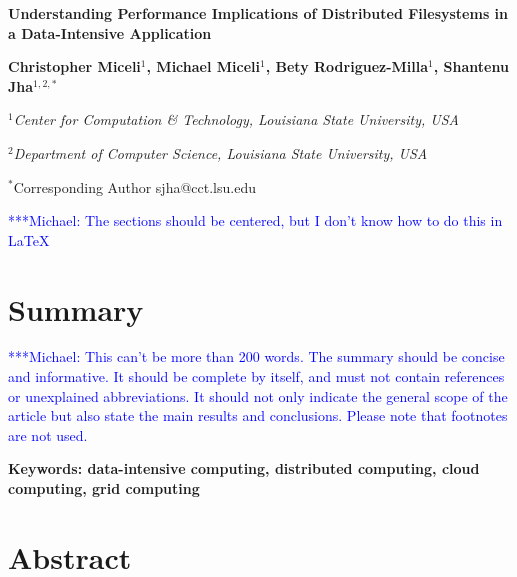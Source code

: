 \documentclass[a4paper,11pt]{article}
\newcommand{\micnote}[1]{ {\textcolor{blue} { ***Michael: #1 }}}
\newcommand{\micnote}[1]{}
\begin{document}
\begin{center}

\textbf{\large Understanding Performance Implications of Distributed
Filesystems in a Data-Intensive Application}

\vspace{0.05in}

\textbf{Christopher Miceli$^{1}$, Michael Miceli$^{1}$, Bety
Rodriguez-Milla$^{1}$, Shantenu Jha$^{1,2,*}$}

\small{\emph{$^{1}$Center for Computation \& Technology, Louisiana State
University, USA}}

\small{\emph{$^{2}$Department of Computer Science, Louisiana State
University, USA}}

{\footnotesize {\hspace{0.0 in} $^*$Corresponding Author
sjha@cct.lsu.edu}}

\end{center}

\micnote{The sections should be centered, but I don't know how to do
this in \LaTeX} \section{Summary}

\micnote{This can't be more than 200 words. The summary should be
concise and informative. It should be complete by itself, and must not
contain references or unexplained abbreviations. It should not only
indicate the general scope of the article but also state the main
results and conclusions. Please note that footnotes are not used.}

\begin{center}\textbf{\small{Keywords:  data-intensive computing,
distributed computing, cloud computing, grid computing}}\end{center}

\section{Abstract}
\end{document}
